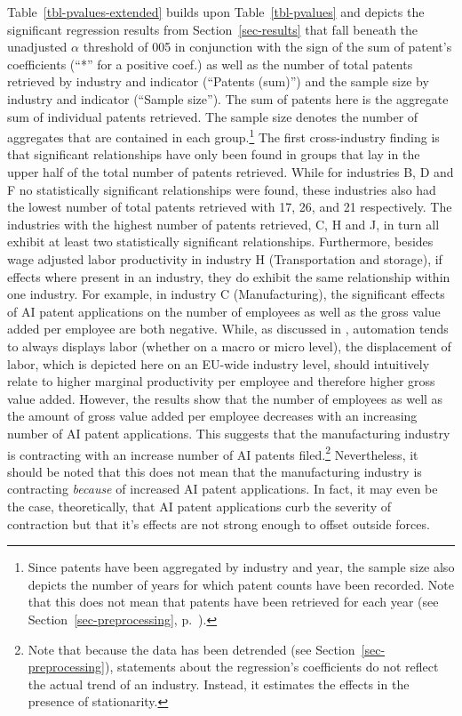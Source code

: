 \documentclass[
  12pt,
  a4paperpaper,
]{article}
\begin{document}
Table~\ref{tbl-pvalues-extended} builds upon Table~\ref{tbl-pvalues} and
depicts the significant regression results from
Section~\ref{sec-results} that fall beneath the unadjusted \(\alpha\)
threshold of 005 in conjunction with the sign of the sum of patent's
coefficients (``*'' for a positive coef.) as well as the number of total
patents retrieved by industry and indicator (``Patents (sum)'') and the
sample size by industry and indicator (``Sample size''). The sum of
patents here is the aggregate sum of individual patents retrieved. The
sample size denotes the number of aggregates that are contained in each
group.\footnote{Since patents have been aggregated by industry and year,
  the sample size also depicts the number of years for which patent
  counts have been recorded. Note that this does not mean that patents
  have been retrieved for each year (see
  Section~\ref{sec-preprocessing},
  p.~\pageref{cleaning-missing-values}).} The first cross-industry
finding is that significant relationships have only been found in groups
that lay in the upper half of the total number of patents retrieved.
While for industries B, D and F no statistically significant
relationships were found, these industries also had the lowest number of
total patents retrieved with 17, 26, and 21 respectively. The industries
with the highest number of patents retrieved, C, H and J, in turn all
exhibit at least two statistically significant relationships.
Furthermore, besides wage adjusted labor productivity in industry H
(Transportation and storage), if effects where present in an industry,
they do exhibit the same relationship within one industry. For example,
in industry C (Manufacturing), the significant effects of AI patent
applications on the number of employees as well as the gross value added
per employee are both negative. While, as discussed in
, automation tends to always displays labor
(whether on a macro or micro level), the displacement of labor, which is
depicted here on an EU-wide industry level, should intuitively relate to
higher marginal productivity per employee and therefore higher gross
value added. However, the results show that the number of employees as
well as the amount of gross value added per employee decreases with an
increasing number of AI patent applications. This suggests that the
manufacturing industry is contracting with an increase number of AI
patents filed.\footnote{Note that because the data has been detrended
  (see Section~\ref{sec-preprocessing}), statements about the
  regression's coefficients do not reflect the actual trend of an
  industry. Instead, it estimates the effects in the presence of
  stationarity.} Nevertheless, it should be noted that this does not
mean that the manufacturing industry is contracting \emph{because} of
increased AI patent applications. In fact, it may even be the case,
theoretically, that AI patent applications curb the severity of
contraction but that it's effects are not strong enough to offset
outside forces.
\end{document}

